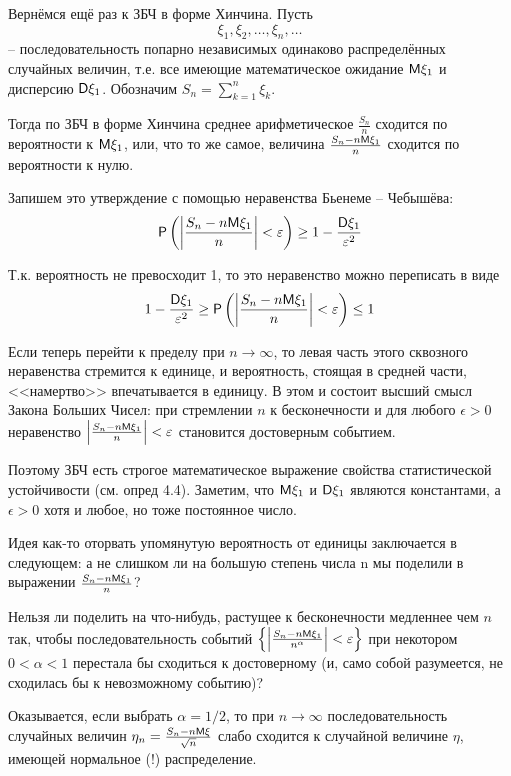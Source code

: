 \begin{zam}
Вернёмся ещё раз к ЗБЧ в форме Хинчина. Пусть $$\xi_1 , \xi_2 , \ldots , \xi_n , \ldots$$ -- последовательность попарно независимых одинаково распределённых случайных величин, т.е. все имеющие математическое ожидание $\mathsf{M}\xi_1$ и дисперсию $\mathsf{D}\xi_1$. Обозначим $S_n=\sum\limits_{k=1}^n\xi_k$. 

Тогда по ЗБЧ в форме Хинчина среднее арифметическое $\frac{S_n}{n}$ сходится по вероятности к $\mathsf{M}\xi_1$, или, что то же самое, величина $\frac{S_n-n\mathsf{M}\xi_1}{n}$ сходится по вероятности к нулю. 

Запишем это утверждение с помощью неравенства Бьенеме – Чебышёва:
$$
\mathsf{P}\left( \left|\frac{S_n-n\mathsf{M}\xi_1}{n}\right| < \varepsilon \right) \geq 1-\frac{\mathsf{D}\xi_1}{\varepsilon^2}
$$

Т.к. вероятность не превосходит 1, то это неравенство можно переписать в виде
$$
1-\frac{\mathsf{D}\xi_1}{\varepsilon^2} \geq \mathsf{P}\left( \left|\frac{S_n-n\mathsf{M}\xi_1}{n}\right| < \varepsilon \right) \leq 1 
$$

Если теперь перейти к пределу при $n \to \infty$, то левая часть этого сквозного неравенства стремится к единице, и вероятность, стоящая в средней части, <<намертво>> впечатывается в единицу. В этом и состоит высший
смысл Закона Больших Чисел: при стремлении $n$ к бесконечности и для любого $\epsilon > 0$ неравенство  $\left|\frac{S_n-n\mathsf{M}\xi_1}{n}\right|  < \varepsilon$ становится достоверным событием. 

Поэтому ЗБЧ есть строгое математическое выражение свойства
статистической устойчивости (см. опред 4.4). Заметим, что $\mathsf{M}\xi_1$ и $\mathsf{D}\xi_1$ являются константами, а $\epsilon > 0$ хотя и любое, но тоже постоянное число.

Идея как-то оторвать упомянутую вероятность от единицы заключается в следующем: а не слишком ли на большую степень числа n мы поделили в выражении $\frac{S_n-n\mathsf{M}\xi_1}{n}$?

Нельзя ли поделить на что-нибудь, растущее к бесконечности
медленнее чем $n$ так, чтобы последовательность событий
$\left\{\left|\frac{S_n-n\mathsf{M}\xi_1}{n^\alpha}\right|  < \varepsilon\right\}$
при некотором $0 < \alpha < 1$ перестала бы сходиться к достоверному (и, само собой разумеется, не сходилась бы к невозможному событию)? 

Оказывается, если выбрать $\alpha = 1/2$, то при $n \to \infty$ последовательность случайных величин $\eta_n = \frac{S_n -n\mathsf{M}\xi}{\sqrt{n}}$ слабо сходится к случайной величине $\eta$, имеющей нормальное (!) распределение.
\end{zam}

